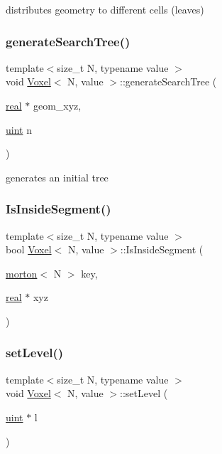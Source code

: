 distributes geometry to different cells (leaves) \mbox{\label{classVoxel_acf4017ddfe4ecfb418cd4c8828eec71d}} 
\subsubsection{\texorpdfstring{generate\+Search\+Tree()}{generateSearchTree()}}
{\footnotesize\ttfamily template$<$size\+\_\+t N, typename value $>$ \\
void \mbox{\hyperlink{classVoxel}{Voxel}}$<$ N, value $>$\+::generate\+Search\+Tree (\begin{DoxyParamCaption}\item[{\mbox{\hyperlink{definitions_8h_aedc0ad84d1e764530814f57ad931d02a}{real}} $\ast$}]{geom\+\_\+xyz,  }\item[{\mbox{\hyperlink{definitions_8h_a69aa29b598b851b0640aa225a9e5d61d}{uint}}}]{n }\end{DoxyParamCaption})}

generates an initial tree \mbox{\label{classVoxel_af2e7050a3c6d74c62c929d6b08f123b3}} 
\subsubsection{\texorpdfstring{Is\+Inside\+Segment()}{IsInsideSegment()}}
{\footnotesize\ttfamily template$<$size\+\_\+t N, typename value $>$ \\
bool \mbox{\hyperlink{classVoxel}{Voxel}}$<$ N, value $>$\+::Is\+Inside\+Segment (\begin{DoxyParamCaption}\item[{\mbox{\hyperlink{definitions_8h_af8682350bd8bb38ee9023f7a0a310add}{morton}}$<$ N $>$}]{key,  }\item[{\mbox{\hyperlink{definitions_8h_aedc0ad84d1e764530814f57ad931d02a}{real}} $\ast$}]{xyz }\end{DoxyParamCaption})}

\mbox{\label{classVoxel_af363467297ff56e7f67c8b8e433fba04}} 
\subsubsection{\texorpdfstring{set\+Level()}{setLevel()}}
{\footnotesize\ttfamily template$<$size\+\_\+t N, typename value $>$ \\
void \mbox{\hyperlink{classVoxel}{Voxel}}$<$ N, value $>$\+::set\+Level (\begin{DoxyParamCaption}\item[{\mbox{\hyperlink{definitions_8h_a69aa29b598b851b0640aa225a9e5d61d}{uint}} $\ast$}]{l }\end{DoxyParamCaption})}

